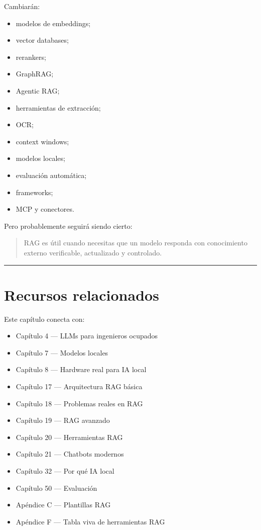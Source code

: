 Cambiarán:

\begin{itemize}
\tightlist
\item
  modelos de embeddings;
\item
  vector databases;
\item
  rerankers;
\item
  GraphRAG;
\item
  Agentic RAG;
\item
  herramientas de extracción;
\item
  OCR;
\item
  context windows;
\item
  modelos locales;
\item
  evaluación automática;
\item
  frameworks;
\item
  MCP y conectores.
\end{itemize}

Pero probablemente seguirá siendo cierto:

\begin{quote}
RAG es útil cuando necesitas que un modelo responda con conocimiento
externo verificable, actualizado y controlado.
\end{quote}

\begin{center}\rule{0.5\linewidth}{0.5pt}\end{center}

\section{Recursos relacionados}\label{recursos-relacionados-15}

Este capítulo conecta con:

\begin{itemize}
\tightlist
\item
  Capítulo 4 --- LLMs para ingenieros ocupados
\item
  Capítulo 7 --- Modelos locales
\item
  Capítulo 8 --- Hardware real para IA local
\item
  Capítulo 17 --- Arquitectura RAG básica
\item
  Capítulo 18 --- Problemas reales en RAG
\item
  Capítulo 19 --- RAG avanzado
\item
  Capítulo 20 --- Herramientas RAG
\item
  Capítulo 21 --- Chatbots modernos
\item
  Capítulo 32 --- Por qué IA local
\item
  Capítulo 50 --- Evaluación
\item
  Apéndice C --- Plantillas RAG
\item
  Apéndice F --- Tabla viva de herramientas RAG
\end{itemize}

